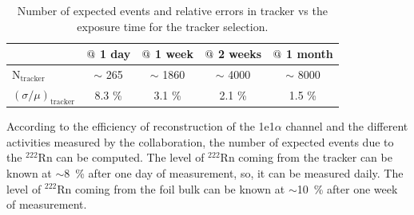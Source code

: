 \documentclass[main.tex]{subfiles}
\begin{document}
\begin{table}[h!]
\begin{center}
\begin{tabular}{l|c|c|c|c}
      & $\symbol{64}~$1 day  & $\symbol{64}~$1 week  & $\symbol{64}~$2 weeks & $\symbol{64}~$1 month  \\
\hline
$\text{N}_\text{tracker}$         & $\sim$ 265 & $\sim$ 1860 & $\sim$ 4000 & $\sim$ 8000 \\ 
$(\sigma / \mu)_{\text{tracker}}$ & 8.3 \%     & 3.1  \%     & 2.1  \%     & 1.5  \% \\
\hline
\end{tabular}
\end{center}
\caption{Number of expected events and relative errors in tracker vs the exposure time for the tracker selection.}
\label{table_number_of_expected_events_relative_error_tracker_selection}
\end{table}


\bigskip
\FloatBarrier




\bigskip


\noindent According to the efficiency of reconstruction of the 1e1$\alpha$ channel and the different activities measured by the collaboration, the number of expected events due to the $^{\text{222}}$Rn can be computed. The level of $^{\text{222}}$Rn coming from the tracker can be known at $\sim$8~\% after one day of measurement, so, it can be measured daily. The level of $^{\text{222}}$Rn coming from the foil bulk can be known at $\sim$10~\% after one week of measurement.
\end{document}
